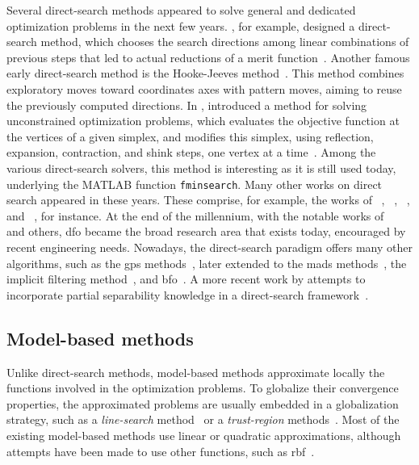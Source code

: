 Several direct-search methods appeared to solve general and dedicated optimization problems in the next few years.
\citeauthor{Rosenbrock_1960}, for example, designed a direct-search method, which chooses the search directions among linear combinations of previous steps that led to actual reductions of a merit function~\cite{Rosenbrock_1960}.
Another famous early direct-search method is the Hooke-Jeeves method~\cite{Hooke_Jeeves_1961}.
This method combines exploratory moves toward coordinates axes with pattern moves, aiming to reuse the previously computed directions.
In \citeyear{Nelder_Mead_1965}, \citeauthor{Nelder_Mead_1965} introduced a method for solving unconstrained optimization problems, which evaluates the objective function at the vertices of a given simplex, and modifies this simplex, using reflection, expansion, contraction, and shink steps, one vertex at a time~\cite{Nelder_Mead_1965}.
Among the various direct-search solvers, this method is interesting as it is still used today, underlying the MATLAB function \verb|fminsearch|.
Many other works on direct search appeared in these years.
These comprise, for example, the works of \citeauthor{Powell_1964}~\cite{Powell_1964,Powell_1975a}, \citeauthor{Matyas_1965}~\cite{Matyas_1965}, \citeauthor{Fletcher_1965}~\cite{Fletcher_1965}, and \citeauthor{Box_1966}~\cite{Box_1966}, for instance.
At the end of the millennium, with the notable works of \citeauthor{Wright_1995}~\cite{Wright_1995} and others, \gls{dfo} became the broad research area that exists today, encouraged by recent engineering needs.
Nowadays, the direct-search paradigm offers many other algorithms, such as the \gls{gps} methods~\cite{Booker_Etal_1999}, later extended to the \gls{mads} methods~\cite{Abramson_Audet_2006,Abramson_Etal_2009,Audet_Dennis_2006,Audet_Dennis_Digabel_2008,Digabel_2011}, the implicit filtering method~\cite{Kelley_2011}, and \gls{bfo}~\cite{Porcelli_Toint_2017}.
A more recent work by \citeauthor{Porcelli_Toint_2022} attempts to incorporate partial separability knowledge in a direct-search framework~\cite{Porcelli_Toint_2022}.

\subsection{Model-based methods}

Unlike direct-search methods, model-based methods approximate locally the functions involved in the optimization problems.
To globalize their convergence properties, the approximated problems are usually embedded in a globalization strategy, such as a \emph{line-search} method~\cite[ch.~3]{Nocedal_Wright_2006} or a \emph{trust-region} methods~\cite{Conn_Gould_Toint_2000,Yuan_2015}.
Most of the existing model-based methods use linear or quadratic approximations, although attempts have been made to use other functions, such as \gls{rbf}~\cite{Oeuvray_2005}.

